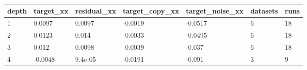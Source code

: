 \begin{tabular}{lllllll}
\toprule
depth & target\_xx & residual\_xx & target\_copy\_xx & target\_noise\_xx & datasets & runs \\
\midrule
1 & 0.0097 & 0.0097 & -0.0019 & -0.0517 & 6 & 18 \\
2 & 0.0123 & 0.014 & -0.0033 & -0.0495 & 6 & 18 \\
3 & 0.012 & 0.0098 & -0.0039 & -0.037 & 6 & 18 \\
4 & -0.0048 & 9.4e-05 & -0.0191 & -0.091 & 3 & 9 \\
\bottomrule
\end{tabular}

